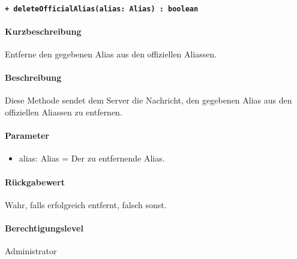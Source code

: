 \paragraph{\texttt{+ deleteOfficialAlias(alias: Alias) : boolean}}%
\paragraph*{Kurzbeschreibung}
Entferne den gegebenen Alias aus den offiziellen Aliassen.
\paragraph*{Beschreibung}
Diese Methode sendet dem Server die Nachricht, den gegebenen Alias aus den offiziellen Aliassen zu entfernen.
\paragraph*{Parameter}
\begin{itemize}
    \item alias: Alias = Der zu entfernende Alias.
\end{itemize}
\paragraph*{Rückgabewert}
Wahr, falls erfolgreich entfernt, falsch sonst.
\paragraph*{Berechtigungslevel}
Administrator